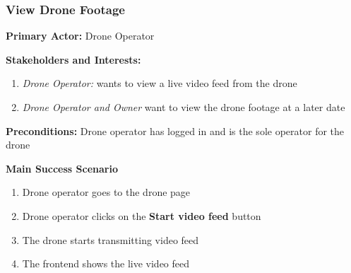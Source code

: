 \subsubsection{\textbf{View Drone Footage}}
\textbf{Primary Actor:} Drone Operator

\textbf{Stakeholders and Interests:}
\begin{enumerate}
    \item \textit{Drone Operator:} wants to view a live video feed from the drone
    \item \textit{Drone Operator and Owner} want to view the drone footage at a later date
\end{enumerate}

\textbf{Preconditions:} Drone operator has logged in and is the sole operator for the drone

\textbf{Main Success Scenario}
\begin{enumerate}
    \item Drone operator goes to the drone page
    \item Drone operator clicks on the \textbf{Start video feed} button
    \item The drone starts transmitting video feed
    \item The frontend shows the live video feed
\end{enumerate}

